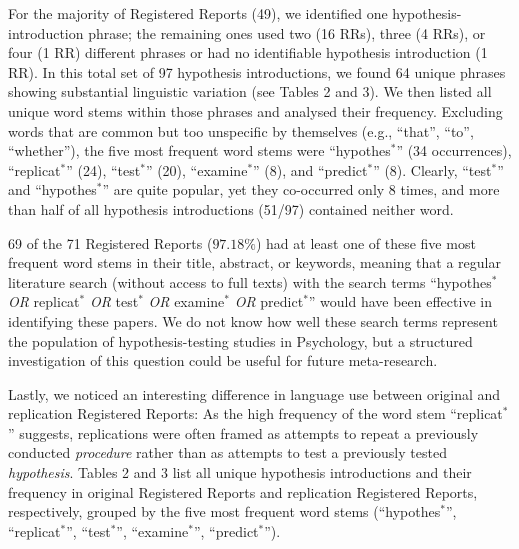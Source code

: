\documentclass[british,,jou,floatsintext]{apa6}
\begin{document}
For the majority of Registered Reports (49), we identified one hypothesis-introduction phrase; the remaining ones used two (16 RRs), three (4 RRs), or four (1 RR) different phrases or had no identifiable hypothesis introduction (1 RR).
In this total set of 97 hypothesis introductions, we found 64 unique phrases showing substantial linguistic variation (see Tables 2 and 3).
We then listed all unique word stems within those phrases and analysed their frequency.
Excluding words that are common but too unspecific by themselves (e.g., \enquote{that}, \enquote{to}, \enquote{whether}), the five most frequent word stems were \enquote{hypothes\(^\ast\)} (34 occurrences), \enquote{replicat\(^\ast\)} (24), \enquote{test\(^\ast\)} (20), \enquote{examine\(^\ast\)} (8), and \enquote{predict\(^\ast\)} (8).
Clearly, \enquote{test\(^\ast\)} and \enquote{hypothes\(^\ast\)} are quite popular, yet they co-occurred only 8 times, and more than half of all hypothesis introductions (51/97) contained neither word.

69 of the 71 Registered Reports (\(97.18 \%\)) had at least one of these five most frequent word stems in their title, abstract, or keywords, meaning that a regular literature search (without access to full texts) with the search terms \enquote{hypothes\(^\ast\) \emph{OR} replicat\(^\ast\) \emph{OR} test\(^\ast\) \emph{OR} examine\(^\ast\) \emph{OR} predict\(^\ast\)} would have been effective in identifying these papers.
We do not know how well these search terms represent the population of hypothesis-testing studies in Psychology, but a structured investigation of this question could be useful for future meta-research.

Lastly, we noticed an interesting difference in language use between original and replication Registered Reports:
As the high frequency of the word stem \enquote{replicat\(^\ast\)} suggests, replications were often framed as attempts to repeat a previously conducted \emph{procedure} rather than as attempts to test a previously tested \emph{hypothesis}.
Tables 2 and 3 list all unique hypothesis introductions and their frequency in original Registered Reports and replication Registered Reports, respectively, grouped by the five most frequent word stems (\enquote{hypothes\(^\ast\)}, \enquote{replicat\(^\ast\)}, \enquote{test\(^\ast\)}, \enquote{examine\(^\ast\)}, \enquote{predict\(^\ast\)}).
\end{document}
